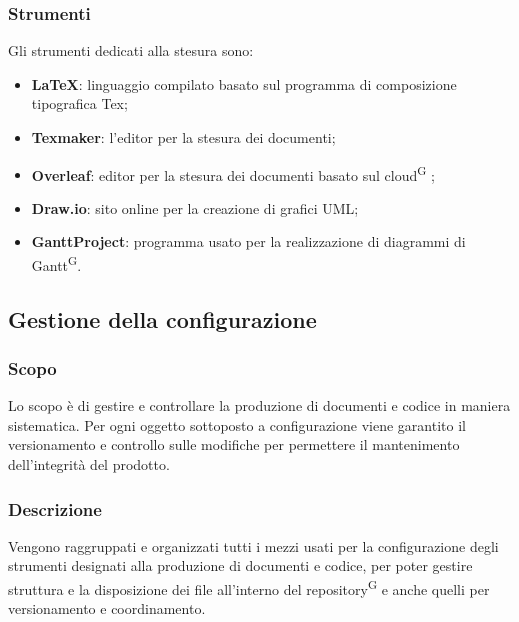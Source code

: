 \subsubsection{Strumenti}
Gli strumenti dedicati alla stesura sono:
\begin{itemize}
\item \textbf{\LaTeX}: linguaggio compilato basato sul programma di composizione tipografica Tex;
\item \textbf{Texmaker}: l’editor per la stesura dei documenti;
\item \textbf{Overleaf}: editor per la stesura dei documenti basato sul cloud\textsuperscript{G} ;
\item \textbf{Draw.io}: sito online per la creazione di grafici UML;
\item \textbf{GanttProject}: programma usato per la realizzazione di diagrammi di Gantt\textsuperscript{G}.
\end{itemize}

\subsection{Gestione della configurazione}
\subsubsection{Scopo}
Lo scopo è di gestire e controllare la produzione di documenti e codice in maniera sistematica. Per ogni oggetto sottoposto a configurazione viene garantito il versionamento e controllo sulle modifiche per permettere il mantenimento dell'integrità del prodotto. 

\subsubsection{Descrizione}
Vengono raggruppati e organizzati tutti i mezzi usati per la configurazione degli strumenti designati alla produzione di documenti e codice, per poter gestire struttura e la disposizione dei file all’interno del repository\textsuperscript{G} e anche  quelli per versionamento e coordinamento.


